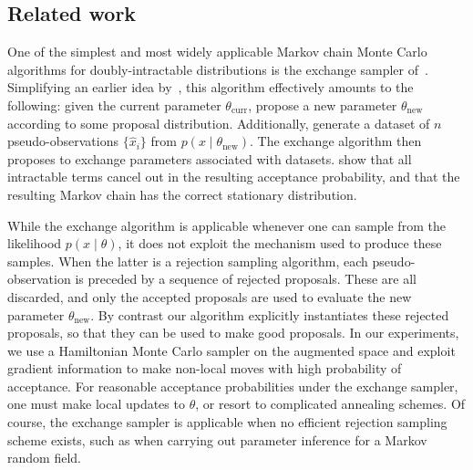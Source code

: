 \subsection{Related work}
 One of the simplest and most widely applicable Markov chain Monte Carlo algorithms for doubly-intractable distributions is the exchange sampler 
of~\cite{murray2006}. Simplifying an earlier idea by~\cite{Moller2006}, this algorithm effectively amounts to the following:
given the current parameter $\theta_{\mathrm{curr}}$, propose a new parameter $\theta_{\mathrm{new}}$ according to some proposal distribution.
Additionally, generate a dataset of $n$ pseudo-observations $\{\hat{x}_i\}$ from $p(x\mid\theta_{\mathrm{new}})$.
The exchange algorithm then proposes to exchange parameters associated with datasets. \cite{murray2006} show that 
all intractable terms cancel out in the resulting acceptance 
probability, and that the resulting Markov chain has the correct stationary distribution.

While the exchange algorithm is applicable whenever one can sample from the likelihood $p(x\mid\theta)$, 
it does not exploit the mechanism used to produce these samples. 
When the latter is a rejection sampling algorithm, each pseudo-observation is preceded by a sequence of rejected proposals.
These are all discarded, and only the accepted proposals are used to evaluate the new parameter $\theta_{\mathrm{new}}$.
By contrast our algorithm explicitly instantiates these rejected proposals, so that they can be used to make {good} proposals. 
In our experiments, we use a Hamiltonian Monte Carlo sampler on the augmented space
and exploit gradient information to make non-local moves with high probability of acceptance.
For reasonable acceptance probabilities under the exchange sampler, one must make local updates to $\theta$, or resort to complicated annealing schemes.
Of course, the exchange sampler is applicable when no efficient rejection 
sampling scheme exists, such as when carrying out parameter inference for
a Markov random field.

